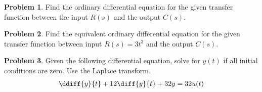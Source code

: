 \documentclass[10pt]{article}
\theoremstyle{definition}
\newtheorem{prob}{Problem}[section]
\begin{document}
\begin{prob}
    Find the ordinary differential equation for the given transfer function between the input \( R(s) \) and the output \( C(s)\).
    \begin{figure}[h]
        \centering
        \begin{scaletikzpicturetowidth}{2\textwidth}
            \end{scaletikzpicturetowidth}
        \end{figure}

\end{prob}

\begin{prob}
    Find the equivalent ordinary differential equation for the given transfer function between input \( R(s) = 3 t^3 \) and the output \( C(s)\).
    \begin{figure}[h]
        \centering
        \begin{scaletikzpicturetowidth}{2\textwidth}
            \end{scaletikzpicturetowidth}
        \end{figure}

\end{prob}

\begin{prob}
    Given the following differential equation, solve for \( y(t) \) if all initial conditions are zero. 
    Use the Laplace transform.
    \begin{align*}
        \ddiff{y}{t} + 12 \diff{y}{t} + 32 y = 32 u(t)
    \end{align*}
\end{prob}
\end{document}

